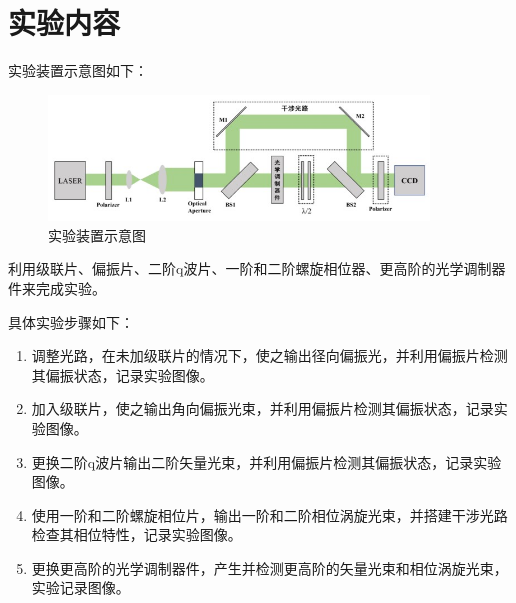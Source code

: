 \documentclass[a4paper,UTF8]{ctexart}
\begin{document}
\section{实验内容}

实验装置示意图如下：

\begin{figure}[H]
    \centering
    \begin{minipage}[b]{0.9\textwidth}
        \centering
        \includegraphics[width=0.9\textwidth]{./fig1.jpg}
        \caption{实验装置示意图}
    \end{minipage}
\end{figure}

利用级联片、偏振片、二阶q波片、一阶和二阶螺旋相位器、更高阶的光学调制器件来完成实验。

具体实验步骤如下：

\begin{enumerate}
    \item 调整光路，在未加级联片的情况下，使之输出径向偏振光，并利用偏振片检测其偏振状态，记录实验图像。
    \item 加入级联片，使之输出角向偏振光束，并利用偏振片检测其偏振状态，记录实验图像。
    \item 更换二阶q波片输出二阶矢量光束，并利用偏振片检测其偏振状态，记录实验图像。
    \item 使用一阶和二阶螺旋相位片，输出一阶和二阶相位涡旋光束，并搭建干涉光路检查其相位特性，记录实验图像。
    \item 更换更高阶的光学调制器件，产生并检测更高阶的矢量光束和相位涡旋光束，实验记录图像。
\end{enumerate}
\end{document}
